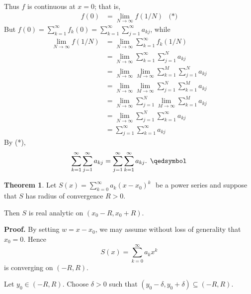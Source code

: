 \documentclass[11pt]{article}
\theoremstyle{definition}
\newtheorem{thm}{Theorem}[section]
\newcommand{\powerseries}{\ensuremath{S(x) = \sum_{k=0}^\infty a_k (x - x_0)^k \text{ }}}
\begin{document}
Thus $f$ is continuous at $x = 0$; that is,
\begin{align*} f(0) & = \lim_{N\to\infty} f(1/N) & \text{(*)} \end{align*}
But $f(0) = \sum_{k=1}^\infty f_k(0) = \sum_{k=1}^\infty \sum_{j=1}^\infty a_{kj}$, while
\begin{align*}
\lim_{N\to\infty} f(1/N) 
& = \lim_{N\to\infty} \sum_{k=1}^\infty f_k(1/N) \\
& = \lim_{N\to\infty} \sum_{k=1}^\infty \sum_{j=1}^N a_{kj} \\
& = \lim_{N\to\infty} \lim_{M\to\infty} \sum_{k=1}^M \sum_{j=1}^N a_{kj} \\
& = \lim_{N\to\infty} \lim_{M\to\infty} \sum_{j=1}^N \sum_{k=1}^M a_{kj} \\
& = \lim_{N\to\infty} \sum_{j=1}^N \lim_{M\to\infty} \sum_{k=1}^M a_{kj} \\
& = \lim_{N\to\infty} \sum_{j=1}^N \sum_{k=1}^\infty a_{kj} \\
& = \sum_{j=1}^\infty \sum_{k=1}^\infty a_{kj}
\end{align*}
By (*),
$$\sum_{k=1}^\infty \sum_{j=1}^\infty a_{kj} = \sum_{j=1}^\infty \sum_{k=1}^\infty a_{kj} \text{. } \qedsymbol$$

\begin{thm}
Let \powerseries be a power series and suppose that $S$ has radius of convergence $R > 0$. 

Then $S$ is real analytic on $(x_0 - R, x_0 + R)$. 
\end{thm}
\textbf{Proof.} By setting $w = x - x_0$, we may assume without loss of generality that $x_0 = 0$. Hence
$$S(x) = \sum_{k=0}^\infty a_k x^k$$
is converging on $(-R, R)$.

Let $y_0 \in (-R, R)$. Choose $\delta > 0$ such that $(y_0 - \delta, y_0 + \delta) \subseteq (-R, R)$. 
\end{document}
